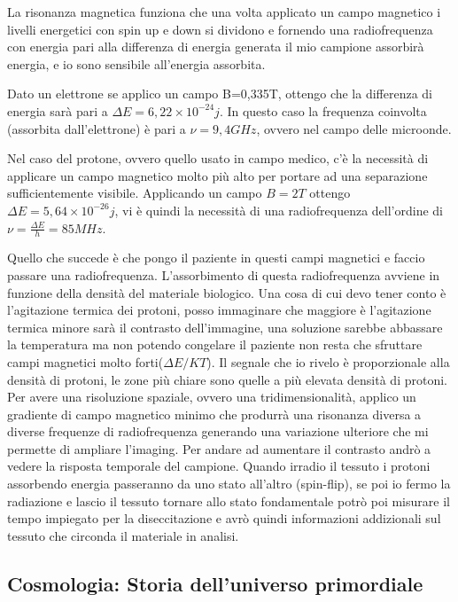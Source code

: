 La risonanza magnetica funziona che una volta applicato un campo magnetico i livelli energetici con spin up e down si dividono e fornendo una radiofrequenza con energia pari alla differenza di energia generata il mio campione assorbirà energia, e io sono sensibile all'energia assorbita. 

Dato un elettrone se applico un campo B=0,335T, ottengo che la differenza di energia sarà pari a $\Delta E=6,22\times 10^{-24}j$.
In questo caso la frequenza coinvolta (assorbita dall'elettrone) è pari a $\nu =9,4GHz$, ovvero nel campo delle microonde.

Nel caso del protone, ovvero quello usato in campo medico, c'è la necessità di applicare un campo magnetico molto più alto per portare ad una separazione sufficientemente visibile. 
Applicando un campo $B=2T$ ottengo $\Delta E=5,64\times10^{-26}j$, vi è quindi la necessità di una radiofrequenza dell'ordine di $\nu =\frac{\Delta E}{h}=85MHz$.

Quello che succede è che pongo il paziente in questi campi magnetici e faccio passare una radiofrequenza. 
L'assorbimento di questa radiofrequenza avviene in funzione della densità del materiale biologico.
Una cosa di cui devo tener conto è l'agitazione termica dei protoni, posso immaginare che maggiore è l'agitazione termica minore sarà il contrasto dell'immagine, una soluzione sarebbe abbassare la temperatura ma non potendo congelare il paziente non resta che sfruttare campi magnetici molto forti($\Delta E/KT$).
Il segnale che io rivelo è proporzionale alla densità di protoni, le zone più chiare sono quelle a più elevata densità di protoni.
Per avere una risoluzione spaziale, ovvero una tridimensionalità, applico un gradiente di campo magnetico minimo che produrrà una risonanza diversa a diverse frequenze di radiofrequenza generando una variazione ulteriore che mi permette di ampliare l'imaging.
Per andare ad aumentare il contrasto andrò a vedere la risposta temporale del campione.
Quando irradio il tessuto i protoni assorbendo energia passeranno da uno stato all'altro (spin-flip), se poi io fermo la radiazione e lascio il tessuto tornare allo stato fondamentale potrò poi misurare il tempo impiegato per la diseccitazione e avrò quindi informazioni addizionali sul tessuto che circonda il materiale in analisi.

\subsection{Cosmologia: Storia dell'universo primordiale}

